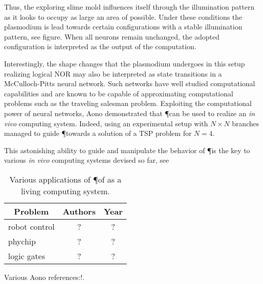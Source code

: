 			Thus, the exploring slime mold influences itself through the illumination pattern as it looks to occupy as large an area of possible. Under these conditions the plasmodium is lead towards certain configurations with a stable illumination pattern, see figure. 
			When all neurons remain unchanged, the adopted configuration is interpreted as the output of the computation.

			Interestingly, the shape changes that the plasmodium undergoes in this setup realizing logical NOR may also be interpreted as state transitions in a McCulloch-Pitts neural network. Such networks have well studied computational capabilities and are known to be capable of approximating computational problems such as the traveling salesman problem. Exploiting the computational power of neural networks, Aono \etal demonstrated that \P can be used to realize an \textit{in vivo} computing system. Indeed, using an experimental setup with $N \times N$ branches managed to guide \P towards a solution of a TSP problem for $N=4$. 

			This astonishing ability to guide and manipulate the behavior of \P is the key to various \textit{in vivo} computing systems devised so far, see 

			\begin{table}
				\centering
				\begin{tabular}{@{} l *2c @{}}
				\toprule
				 \multicolumn{1}{c}{Problem}    & Authors  & Year   \\ 
				\midrule
				 robot control & ? & ? \\ 
				 phychip & ? & ? \\ 
				 logic gates & ? & ? \\ 
				 
				\bottomrule
				\end{tabular}
				\caption[Computing with live \P]{Various applications of \P of as a living computing system.}
				\label{tab:list_invivo}
			\end{table}

			Various Aono references:!\cite{Aono:2007:ANC:1284621.1284651,Aono2009,Aono2007,Aono200883}.





